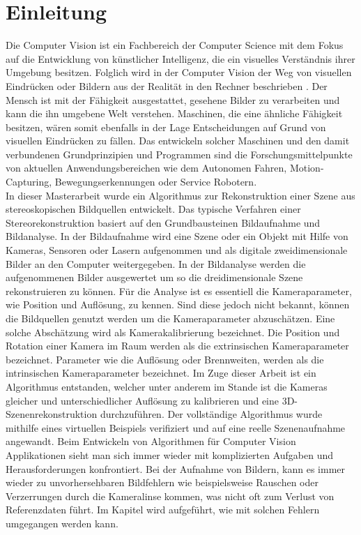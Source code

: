 \chapter{Einleitung}
\label{sec:einleitung} 



Die Computer Vision ist ein Fachbereich der Computer Science mit dem Fokus auf die Entwicklung von künstlicher Intelligenz, die ein visuelles Verständnis ihrer Umgebung besitzen. Folglich wird in der Computer Vision der Weg von visuellen Eindrücken oder Bildern aus der Realität in den Rechner beschrieben \cite{ComputerVision}. Der Mensch ist mit der Fähigkeit ausgestattet, gesehene Bilder zu verarbeiten und  kann die ihn umgebene Welt verstehen. Maschinen, die eine ähnliche Fähigkeit besitzen, wären somit ebenfalls in der Lage Entscheidungen auf Grund von visuellen Eindrücken zu fällen. Das entwickeln solcher Maschinen und den damit verbundenen Grundprinzipien und Programmen sind die Forschungsmittelpunkte von aktuellen Anwendungsbereichen wie dem Autonomen Fahren, Motion-Capturing, Bewegungserkennungen oder Service Robotern.\\

In dieser Masterarbeit wurde ein Algorithmus zur Rekonstruktion einer Szene aus stereoskopischen Bildquellen entwickelt. Das typische Verfahren einer Stereorekonstruktion basiert auf den Grundbausteinen Bildaufnahme und Bildanalyse\cite{ComputerVision}. In der Bildaufnahme wird eine Szene oder ein Objekt mit Hilfe von Kameras, Sensoren oder Lasern aufgenommen und als digitale zweidimensionale Bilder an den Computer weitergegeben. In der Bildanalyse werden die aufgenommenen Bilder ausgewertet um so die dreidimensionale Szene rekonstruieren zu können. Für die Analyse ist es essentiell die Kameraparameter, wie Position und Auflösung, zu kennen. Sind diese jedoch nicht bekannt, können die Bildquellen genutzt werden um die Kameraparameter abzuschätzen. Eine solche Abschätzung wird als Kamerakalibrierung\cite{HZ,Ferid,Elements,ZZGXr} bezeichnet. Die Position und Rotation einer Kamera im Raum werden als die extrinsischen Kameraparameter bezeichnet. Parameter wie die Auflösung oder Brennweiten, werden als die intrinsischen Kameraparameter bezeichnet\cite{HZ,Ferid}. Im Zuge dieser Arbeit ist ein Algorithmus entstanden, welcher unter anderem im Stande ist die Kameras gleicher und unterschiedlicher Auflösung zu kalibrieren und eine 3D-Szenenrekonstruktion durchzuführen. Der vollständige Algorithmus wurde mithilfe eines virtuellen Beispiels verifiziert und auf eine reelle Szenenaufnahme angewandt. Beim Entwickeln von Algorithmen für Computer Vision Applikationen sieht man sich immer wieder mit komplizierten Aufgaben und Herausforderungen konfrontiert. Bei der Aufnahme von Bildern, kann es immer wieder zu unvorhersehbaren Bildfehlern wie beispielsweise Rauschen oder Verzerrungen durch die Kameralinse kommen, was nicht oft zum Verlust von Referenzdaten führt. Im Kapitel  wird aufgeführt, wie mit solchen Fehlern umgegangen werden kann.\\

